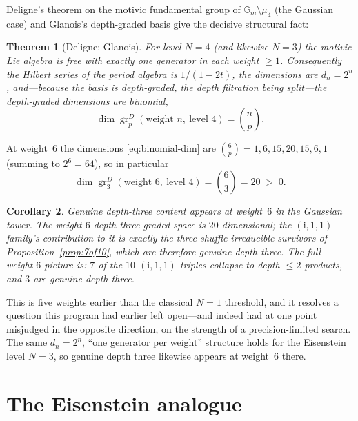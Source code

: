 \documentclass[11pt]{article}
\newcommand{\iu}{\mathrm{i}}
\newcommand{\gr}{\operatorname{gr}}
\theoremstyle{plain}
\newtheorem{theorem}{Theorem}
\newtheorem{corollary}[theorem]{Corollary}
\theoremstyle{remark}
\begin{document}
Deligne's theorem on the motivic fundamental group of $\mathbb{G}_m\setminus\mu_4$ (the Gaussian case)
and Glanois's depth-graded basis give the decisive structural fact:

\begin{theorem}[Deligne; Glanois]\label{thm:deligne}
For level $N=4$ (and likewise $N=3$) the motivic Lie algebra is free with exactly one generator in
each weight $\ge1$. Consequently the Hilbert series of the period algebra is $1/(1-2t)$, the
dimensions are $d_n=2^n$, and---because the basis is depth-graded, the depth filtration being
split---the depth-graded dimensions are binomial,
\begin{equation}\label{eq:binomial-dim}
  \dim\gr^D_p(\text{weight }n,\ \text{level }4)=\binom{n}{p}.
\end{equation}
\end{theorem}

At weight~$6$ the dimensions \eqref{eq:binomial-dim} are
$\binom{6}{p}=1,6,15,20,15,6,1$ (summing to $2^6=64$), so in particular
\begin{equation}\label{eq:gr3-positive}
  \dim\gr^D_3(\text{weight }6,\ \text{level }4)=\binom{6}{3}=20\;>\;0.
\end{equation}

\begin{corollary}\label{cor:depth3}
Genuine depth-three content appears at weight~$6$ in the Gaussian tower. The weight-$6$ depth-three
graded space is $20$-dimensional; the $(\iu,1,1)$ family's contribution to it is exactly the three
shuffle-irreducible survivors of Proposition~\ref{prop:7of10}, which are therefore genuine depth three.
The full weight-$6$ picture is: $7$ of the $10$ $(\iu,1,1)$ triples collapse to depth-$\le2$ products,
and $3$ are genuine depth three.
\end{corollary}

This is five weights earlier than the classical $N=1$ threshold, and it resolves a question this
program had earlier left open---and indeed had at one point misjudged in the opposite direction, on
the strength of a precision-limited search. The same $d_n=2^n$, ``one generator per weight'' structure
holds for the Eisenstein level $N=3$, so genuine depth three likewise appears at weight~$6$ there.

\section{The Eisenstein analogue}\label{sec:eisenstein}
\end{document}

